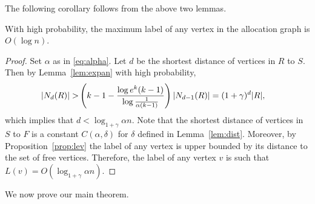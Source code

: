 The following corollary follows from the above two lemmas. 
\begin{corollary} \label{cor:maxLabel}
With high probability, the maximum label of any vertex in the allocation graph is $O(\log n)$.
\end{corollary}
\begin{proof}
Set $\alpha$ as in \eqref{eq:alpha}.
  Let $d$ be the shortest distance of vertices in $R$ to $S$. Then by Lemma~\ref{lem:expan}  with high probability,
    \begin{align*}
   |N_{d}(R) | >  &\left( k-1- {\log e^{k}(k-1) \over \log{1\over \alpha(k-1)}}\right)  | N_{d-1}(R)|  = (1+\gamma)^d  |R|, 
  \end{align*}
which implies that $d< \log_{1+\gamma} \alpha n $.
Note that the shortest distance of vertices in $S$ to $F$ is a constant $C(\alpha,\delta)$ for $\delta$ defined in Lemma~\ref{lem:dist}. Moreover, by Proposition~\ref{prop:lev} the label of any vertex is upper bounded by its distance to the set of free vertices. Therefore, the label of any vertex $v$ is such that $L(v) = O( \log_{1+\gamma} \alpha n)$.
\end{proof}
We now prove our main theorem.
\vspace{-4pt}
